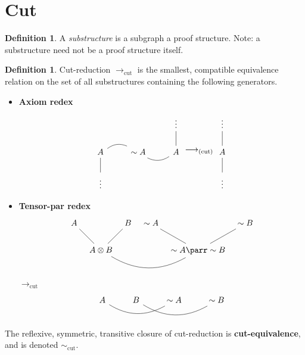 \documentclass[12pt]{article}
\theoremstyle{plain}
\theoremstyle{definition}
\newtheorem{defn}[thm]{Definition} %
\newcommand{\lto}{\longrightarrow}
\newcommand{\cut}{(\operatorname{cut})}
\newcommand{\negation}{\sim}
\begin{document}
	\section{Cut}
	\begin{defn}
		A \emph{substructure} is a subgraph a proof structure. Note: a substructure need not be a proof structure itself.
	\end{defn}
	
	\begin{defn}\label{def:cut_reduction}
		Cut-reduction $\lto_{\operatorname{cut}}$ is the smallest, compatible equivalence relation on the set of all substructures containing the following generators.
		\begin{itemize}
			\item \textbf{Axiom redex}
			\begin{equation}\label{eq:cut_red_ax}
				\begin{tikzcd}
					& & \vdots\arrow[d,dash]\\
					A\arrow[r,dash, bend left]\arrow[d,dash] & \negation A\arrow[r,dash, bend right] & A\\
					\vdots
				\end{tikzcd}
				\lto_{\cut}
				\begin{tikzcd}
					\vdots\arrow[d,dash]\\
					A\arrow[d,dash]\\
					\vdots
				\end{tikzcd}
			\end{equation}
			\item \textbf{Tensor-par redex}
			\begin{equation}\label{eq:cut_red_tens}
				\begin{tikzcd}[column sep = tiny]
					A\arrow[dr,dash] && B\arrow[dl,dash] & \negation A\arrow[dr,dash] && \negation B\arrow[dl,dash]\\
					& A \otimes B\arrow[rrr,dash, bend right] & & & \negation A \parr \negation B
				\end{tikzcd}
			\end{equation}
			$\lto_{\operatorname{cut}}$
			\begin{equation}
				\begin{tikzcd}
					A\arrow[rr,dash,bend right] & B\arrow[rr,dash,bend right] & \negation A & \negation B
				\end{tikzcd}
			\end{equation}
		\end{itemize}
		The reflexive, symmetric, transitive closure of cut-reduction is \textbf{cut-equivalence}, and is denoted $\sim_{\operatorname{cut}}$.
	\end{defn}
\end{document}
